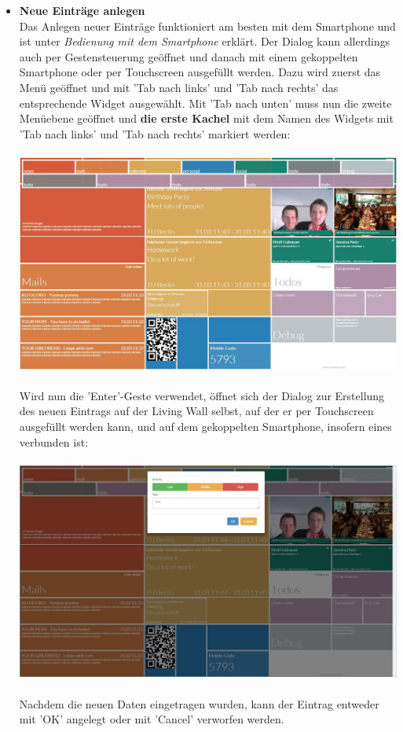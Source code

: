 \documentclass[10pt,a4paper]{report}
\begin{document}
\begin{itemize}
				\item \textbf{Neue Einträge anlegen}\\
				Das Anlegen neuer Einträge funktioniert am besten mit dem Smartphone und ist unter \textit{Bedienung mit dem Smartphone} erklärt. Der Dialog kann allerdings auch per Gestensteuerung geöffnet und danach mit einem gekoppelten Smartphone oder per Touchscreen ausgefüllt werden. Dazu wird zuerst das Menü geöffnet und mit 'Tab nach links' und 'Tab nach rechts' das entsprechende Widget ausgewählt. Mit 'Tab nach unten' muss nun die zweite Menüebene geöffnet und \textbf{die erste Kachel} mit dem Namen des Widgets mit 'Tab nach links' und 'Tab nach rechts' markiert werden:\\\\
				\includegraphics[width=\linewidth]{SelectTodo}\\\\
				Wird nun die 'Enter'-Geste verwendet, öffnet sich der Dialog zur Erstellung des neuen Eintrags auf der Living Wall selbst, auf der er per Touchscreen ausgefüllt werden kann, und auf dem gekoppelten Smartphone, insofern eines verbunden ist:\\\\
				\includegraphics[width=\linewidth]{CreateTodo}\\\\
				Nachdem die neuen Daten eingetragen wurden, kann der Eintrag entweder mit 'OK' angelegt oder mit 'Cancel' verworfen werden.
			\end{itemize}
\end{document}

